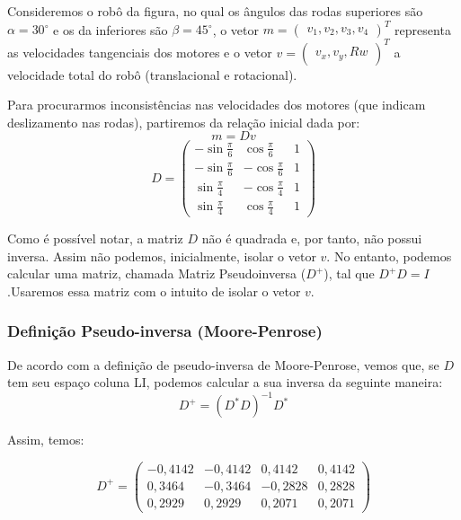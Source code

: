 \documentclass{article}
\begin{document}
\hspace{1cm}Consideremos o robô da figura, no qual os ângulos das rodas superiores são $\alpha=30^{\circ}$ e os da inferiores são $\beta=45^{\circ}$, o vetor $m = \begin{pmatrix} v_{1},v_{2},v_{3},v_{4} \end{pmatrix}^T$ representa as velocidades tangenciais dos motores e o vetor $v = \begin{pmatrix} v_{x},v_{y},Rw \end{pmatrix}^T$ a velocidade total do robô (translacional e rotacional).

Para procurarmos inconsistências nas velocidades dos motores (que indicam deslizamento nas rodas), partiremos da relação inicial dada por:
\[m = Dv\]
\[D
=
\begin{pmatrix}
  -\sin{\frac{\pi}{6}} &  \cos{\frac{\pi}{6}} & 1 \\
  -\sin{\frac{\pi}{6}} &  -\cos{\frac{\pi}{6}} &  1 \\
  \sin{\frac{\pi}{4}} & -\cos{\frac{\pi}{4}}   &  1  \\
  \sin{\frac{\pi}{4}} &  \cos{\frac{\pi}{4}} & 1
 \end{pmatrix}
\]

Como é possível notar, a matriz $D$ não é quadrada e, por tanto, não possui inversa. Assim não podemos, inicialmente, isolar o vetor $v$. No entanto, podemos calcular uma matriz, chamada Matriz Pseudoinversa ($D^+$), tal que $D^+D=I$ .Usaremos essa matriz com o intuito de isolar o vetor $v$.

\subsubsection{Definição Pseudo-inversa (Moore-Penrose)}

\hspace{1cm} De acordo com a definição de pseudo-inversa de Moore-Penrose, vemos que, se $D$ tem seu espaço coluna LI, podemos calcular a sua inversa da seguinte maneira:
\[ D^+ = (D^*D)^{-1} D^*\]

Assim, temos:

\[D^+
=
\begin{pmatrix}
  -0,4142    &-0,4142    & 0,4142    & 0,4142    \\
 0,3464 &  -0,3464 & -0,2828 & 0,2828 \\
 0,2929 & 0,2929 & 0,2071& 0,2071
 \end{pmatrix}
\]
\end{document}
